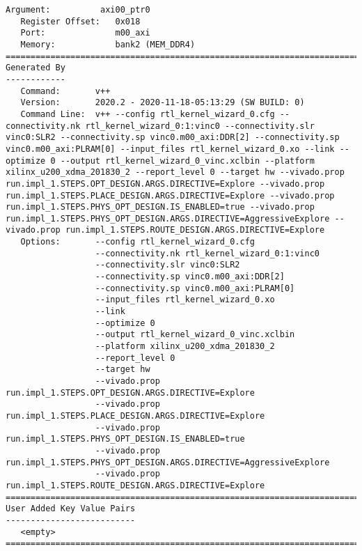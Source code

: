 \begin{lstlisting}[label=code:info_file, caption=Содержимое xclbin.info-файла, basicstyle=\tiny]
   Argument:          axi00_ptr0
   Register Offset:   0x018
   Port:              m00_axi
   Memory:            bank2 (MEM_DDR4)
==============================================================================
Generated By
------------
   Command:       v++
   Version:       2020.2 - 2020-11-18-05:13:29 (SW BUILD: 0)
   Command Line:  v++ --config rtl_kernel_wizard_0.cfg --connectivity.nk rtl_kernel_wizard_0:1:vinc0 --connectivity.slr vinc0:SLR2 --connectivity.sp vinc0.m00_axi:DDR[2] --connectivity.sp vinc0.m00_axi:PLRAM[0] --input_files rtl_kernel_wizard_0.xo --link --optimize 0 --output rtl_kernel_wizard_0_vinc.xclbin --platform xilinx_u200_xdma_201830_2 --report_level 0 --target hw --vivado.prop run.impl_1.STEPS.OPT_DESIGN.ARGS.DIRECTIVE=Explore --vivado.prop run.impl_1.STEPS.PLACE_DESIGN.ARGS.DIRECTIVE=Explore --vivado.prop run.impl_1.STEPS.PHYS_OPT_DESIGN.IS_ENABLED=true --vivado.prop run.impl_1.STEPS.PHYS_OPT_DESIGN.ARGS.DIRECTIVE=AggressiveExplore --vivado.prop run.impl_1.STEPS.ROUTE_DESIGN.ARGS.DIRECTIVE=Explore 
   Options:       --config rtl_kernel_wizard_0.cfg
                  --connectivity.nk rtl_kernel_wizard_0:1:vinc0
                  --connectivity.slr vinc0:SLR2
                  --connectivity.sp vinc0.m00_axi:DDR[2]
                  --connectivity.sp vinc0.m00_axi:PLRAM[0]
                  --input_files rtl_kernel_wizard_0.xo
                  --link
                  --optimize 0
                  --output rtl_kernel_wizard_0_vinc.xclbin
                  --platform xilinx_u200_xdma_201830_2
                  --report_level 0
                  --target hw
                  --vivado.prop run.impl_1.STEPS.OPT_DESIGN.ARGS.DIRECTIVE=Explore
                  --vivado.prop run.impl_1.STEPS.PLACE_DESIGN.ARGS.DIRECTIVE=Explore
                  --vivado.prop run.impl_1.STEPS.PHYS_OPT_DESIGN.IS_ENABLED=true
                  --vivado.prop run.impl_1.STEPS.PHYS_OPT_DESIGN.ARGS.DIRECTIVE=AggressiveExplore
                  --vivado.prop run.impl_1.STEPS.ROUTE_DESIGN.ARGS.DIRECTIVE=Explore 
==============================================================================
User Added Key Value Pairs
--------------------------
   <empty>
==============================================================================
\end{lstlisting}